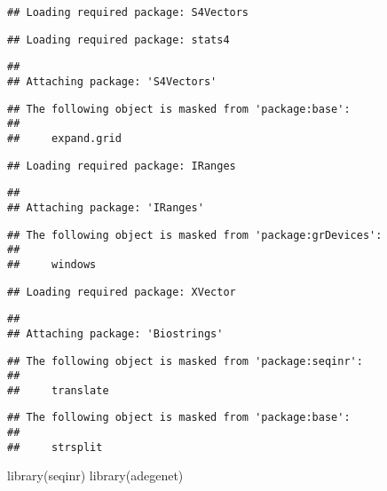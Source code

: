 \documentclass[
]{article}
\newenvironment{Shaded}{\begin{snugshade}}{\end{snugshade}}
\newcommand{\FunctionTok}[1]{\textcolor[rgb]{0.00,0.00,0.00}{#1}}
\newcommand{\NormalTok}[1]{#1}
\begin{document}
\begin{verbatim}
## Loading required package: S4Vectors
\end{verbatim}

\begin{verbatim}
## Loading required package: stats4
\end{verbatim}

\begin{verbatim}
## 
## Attaching package: 'S4Vectors'
\end{verbatim}

\begin{verbatim}
## The following object is masked from 'package:base':
## 
##     expand.grid
\end{verbatim}

\begin{verbatim}
## Loading required package: IRanges
\end{verbatim}

\begin{verbatim}
## 
## Attaching package: 'IRanges'
\end{verbatim}

\begin{verbatim}
## The following object is masked from 'package:grDevices':
## 
##     windows
\end{verbatim}

\begin{verbatim}
## Loading required package: XVector
\end{verbatim}

\begin{verbatim}
## 
## Attaching package: 'Biostrings'
\end{verbatim}

\begin{verbatim}
## The following object is masked from 'package:seqinr':
## 
##     translate
\end{verbatim}

\begin{verbatim}
## The following object is masked from 'package:base':
## 
##     strsplit
\end{verbatim}

\begin{Shaded}
\begin{Highlighting}[]
\FunctionTok{library}\NormalTok{(seqinr)}
\FunctionTok{library}\NormalTok{(adegenet)}
\end{Highlighting}
\end{Shaded}
\end{document}
